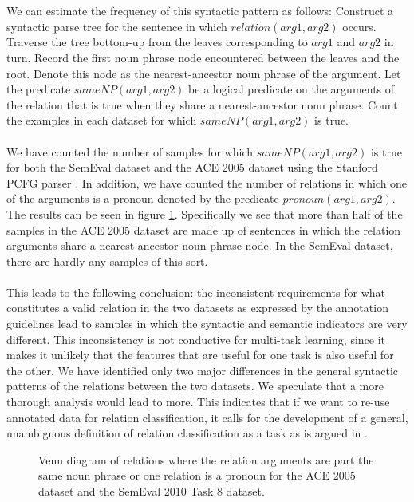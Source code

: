 \\\\
We can estimate the frequency of this syntactic pattern as follows: Construct a syntactic parse tree for the sentence in which $relation(arg1,arg2)$ occurs. Traverse the tree bottom-up from the leaves corresponding to $arg1$ and $arg2$ in turn. Record the first noun phrase node encountered between the leaves and the root. Denote this node as the nearest-ancestor noun phrase of the argument. Let the predicate $sameNP(arg1, arg2)$ be a logical predicate on the arguments of the relation that is true when they share a nearest-ancestor noun phrase. Count the examples in each dataset for which $sameNP(arg1, arg2)$ is true.
\\\\
We have counted the number of samples for which $sameNP(arg1,arg2)$ is true for both the SemEval dataset and the ACE 2005 dataset using the Stanford PCFG parser \citep{klein2003}. In addition, we have counted the number of relations in which one of the arguments is a pronoun denoted by the predicate $pronoun(arg1,arg2)$. The results can be seen in figure \ref{same_noun_phrase}. Specifically we see that more than half of the samples in the ACE 2005 dataset are made up of sentences in which the relation arguments share a nearest-ancestor noun phrase node. In the SemEval dataset, there are hardly any samples of this sort.
\\\\
This leads to the following conclusion: the inconsistent requirements for what constitutes a valid relation in the two datasets as expressed by the annotation guidelines lead to samples in which the syntactic and semantic indicators are very different. This inconsistency is not conductive for multi-task learning, since it makes it unlikely that the features that are useful for one task is also useful for the other. We have identified only two major differences in the general syntactic patterns of the relations between the two datasets. We speculate that a more thorough analysis would lead to more. This indicates that if we want to re-use annotated data for relation classification, it calls for the development of a general, unambiguous definition of relation classification as a task as is argued in \cite{handschuh2016}.
\newpage
\begin{figure}[h!]
	\centering
	
	
	\vspace{1cm}
	
	
	\caption{Venn diagram of relations where the relation arguments are part the same noun phrase or one relation is a pronoun for the ACE 2005 dataset and the SemEval 2010 Task 8 dataset.}
	\label{same_noun_phrase}
\end{figure}
